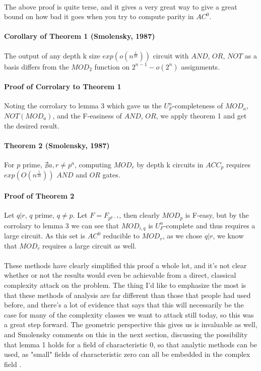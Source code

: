 \documentclass{article}
\begin{document}
\paragraph*{}
  The above proof is quite terse, and it gives a very great way to give a great bound on how bad
it goes when you try to compute parity in $AC^0$.

\paragraph*{Corollary of Theorem 1 (Smolensky, 1987)}
  The output of any depth k size $exp(o(n^{\frac{1}{2k}}))$ circuit with $AND$, $OR$, $NOT$ as
a basis differs from the $MOD_2$ function on $2^{n-1} - o(2^n)$ assignments.

\paragraph*{Proof of Corrolary to Theorem 1}
  Noting the corrolary to lemma 3 which gave us the $U_F^n$-completeness of $MOD_a$, $NOT(MOD_a)$,
and the F-easiness of $AND$, $OR$, we apply theorem 1 and get the desired result.

\paragraph*{Theorem 2 (Smolensky, 1987)}
  For $p$ prime, $\nexists a, r \neq p^a$, computing $MOD_r$ by depth k circuits in $ACC_p$ requires
$exp(O(n^{\frac{1}{2k}}))$ $AND$ and $OR$ gates.

\paragraph*{Proof of Theorem 2 \cite{Smolensky1987}} 
  Let $q | r$, $q$ prime, $q \neq p$. Let $F = F_{p^{q-1}}$, then clearly $MOD_p$ is F-easy, but
by the corrolary to lemma 3 we can see that $MOD_{i, q}$ is $U_F^n$-complete and thus requires a
large circuit. As this set is $AC^0$ reducible to $MOD_r$, as we chose $q | r$, we know that
$MOD_r$ requires a large circuit as well.

\paragraph*{}
  These methods have clearly simplified this proof a whole lot, and it's not clear whether or not
the results would even be achievable from a direct, classical complexity attack on the problem. The
thing I'd like to emphasize the most is that these methods of analysis are far different than those
that people had used before, and there's a lot of evidence that says that this will necessarily be
the case for many of the complexity classes we want to attack still today, so this was a great step
forward. The geometric perspective this gives us is invaluable as well, and Smolensky comments on
this in the next section, discussing the possibility that lemma 1 holds for a field of characteristic
0, so that analytic methods can be used, as "small" fields of characteristic zero can all be
embedded in the complex field \cite{Smolensky1987}.
\end{document}
